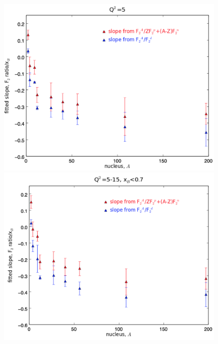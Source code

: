 \documentclass[oneside]{article}
\begin{document}
  \begin{figure}[H]
\begin{minipage}{0.5\textwidth}
 \includegraphics[width=\textwidth]{plots/plotsvA/Aslope_q5.png}
\end{minipage}\hfill\begin{minipage}{0.5\textwidth}
\includegraphics[width=\textwidth]{plots/plotsvA/Aslope_l7.png}
\end{minipage}\hfill\begin{minipage}{0.5\textwidth}

\end{minipage}
\end{figure}
\end{document}
